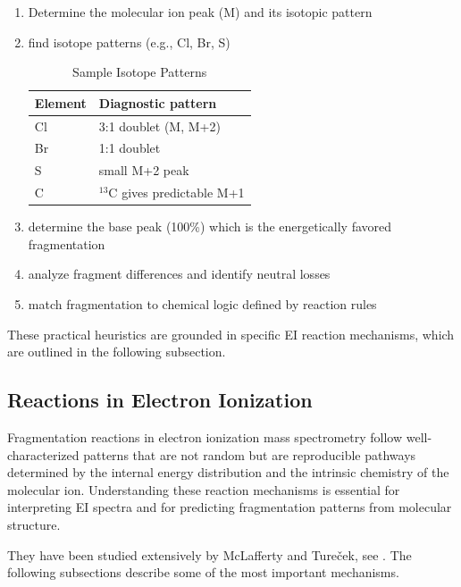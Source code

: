 \begin{enumerate}
    \item Determine the molecular ion peak (M) and its isotopic pattern
    \item find isotope patterns (e.g., Cl, Br, S)
        \begin{table}[H]
        \centering
        \caption{Sample Isotope Patterns}
        \label{tab:isotope-patterns}
            \begin{tabular}{ll}
                \hline
                Element & Diagnostic pattern \\
                \hline
                Cl & 3:1 doublet (M, M+2) \\
                Br & 1:1 doublet \\
                S & small M+2 peak \\
                C & $^{13}$C gives predictable M+1 \\
                \hline
            \end{tabular}
        \end{table}
    \item determine the base peak (100\%) which is the energetically favored fragmentation
    \item analyze fragment differences and identify neutral losses
    \item match fragmentation to chemical logic defined by reaction rules
\end{enumerate}

These practical heuristics are grounded in specific EI reaction mechanisms, which are outlined in the following subsection.

\subsection{Reactions in Electron Ionization}

Fragmentation reactions in electron ionization mass spectrometry follow well-characterized patterns that are not random but are reproducible pathways determined by \cite{Ashyrmamatov2025} the internal energy distribution and the intrinsic chemistry of the molecular ion. \cite[p.~846]{Dantus2024}
Understanding these reaction mechanisms is essential for interpreting EI spectra and for predicting fragmentation patterns from molecular structure. \cite[p.~846]{Dantus2024}

They have been studied extensively by McLafferty and Tureček, see \cite{McLafferty1993}.
The following subsections describe some of the most important mechanisms.

